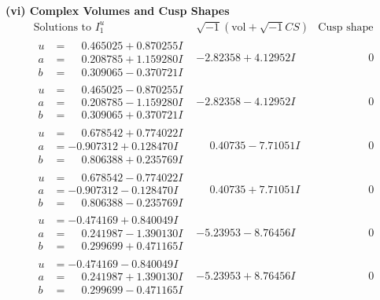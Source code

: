 \documentclass[1p]{elsarticle_modified}
\theoremstyle{definition}
\newcommand{\I}{\sqrt{-1}}
\begin{document}
\newpage\flushleft \textbf{(vi) Complex Volumes and Cusp Shapes}
$$\begin{array}{c|c|c}  
\text{Solutions to }I^u_{1}& \I (\text{vol} + \sqrt{-1}CS) & \text{Cusp shape}\\
 \hline 
\begin{aligned}
u &= \phantom{-}0.465025 + 0.870255 I \\
a &= \phantom{-}0.208785 + 1.159280 I \\
b &= \phantom{-}0.309065 - 0.370721 I\end{aligned}
 & -2.82358 + 4.12952 I & \phantom{-0.000000 } 0 \\ \hline\begin{aligned}
u &= \phantom{-}0.465025 - 0.870255 I \\
a &= \phantom{-}0.208785 - 1.159280 I \\
b &= \phantom{-}0.309065 + 0.370721 I\end{aligned}
 & -2.82358 - 4.12952 I & \phantom{-0.000000 } 0 \\ \hline\begin{aligned}
u &= \phantom{-}0.678542 + 0.774022 I \\
a &= -0.907312 + 0.128470 I \\
b &= \phantom{-}0.806388 + 0.235769 I\end{aligned}
 & \phantom{-}0.40735 - 7.71051 I & \phantom{-0.000000 } 0 \\ \hline\begin{aligned}
u &= \phantom{-}0.678542 - 0.774022 I \\
a &= -0.907312 - 0.128470 I \\
b &= \phantom{-}0.806388 - 0.235769 I\end{aligned}
 & \phantom{-}0.40735 + 7.71051 I & \phantom{-0.000000 } 0 \\ \hline\begin{aligned}
u &= -0.474169 + 0.840049 I \\
a &= \phantom{-}0.241987 - 1.390130 I \\
b &= \phantom{-}0.299699 + 0.471165 I\end{aligned}
 & -5.23953 - 8.76456 I & \phantom{-0.000000 } 0 \\ \hline\begin{aligned}
u &= -0.474169 - 0.840049 I \\
a &= \phantom{-}0.241987 + 1.390130 I \\
b &= \phantom{-}0.299699 - 0.471165 I\end{aligned}
 & -5.23953 + 8.76456 I & \phantom{-0.000000 } 0 \\ \hline\begin{aligned}

\end{aligned}
\end{array}$$
\end{document}
